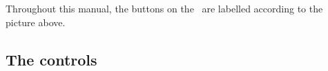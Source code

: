 \begin{center}
\end{center}

Throughout this manual, the buttons on the \dap\ are labelled according to the
picture above.

\subsection{The \daps{} controls}

